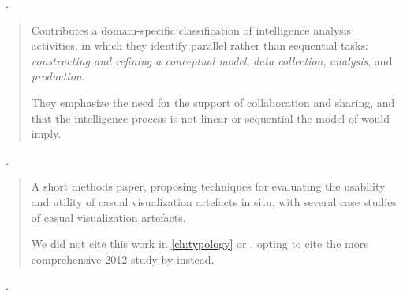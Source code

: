\begin{sloppypar}
~\cite{Kang2011}. \end{sloppypar}

\begin{quotation}
    \begin{sloppypar}
    Contributes a domain-specific classification of intelligence analysis activities, in which they identify parallel rather than sequential tasks: {\it constructing and refining a conceptual model}, {\it data collection}, {\it analysis}, and {\it production}.
    \end{sloppypar}
    
    They emphasize the need for the support of collaboration and sharing, and that the intelligence process is not linear or sequential the model of \citet{Pirolli2005} would imply. 
\end{quotation}

\begin{sloppypar}
~\cite{Sprague2009}. \end{sloppypar}

\begin{quotation}
    A short methods paper, proposing techniques for evaluating the usability and utility of casual visualization artefacts in situ, with several case studies of casual visualization artefacts.
    
    We did not cite this work in \autoref{ch:typology} or \citet{Brehmer2013}, opting to cite the more comprehensive 2012 study by \citet{Sprague2012} instead.
\end{quotation}

\begin{sloppypar}
~\cite{Sprague2012}. \end{sloppypar}

